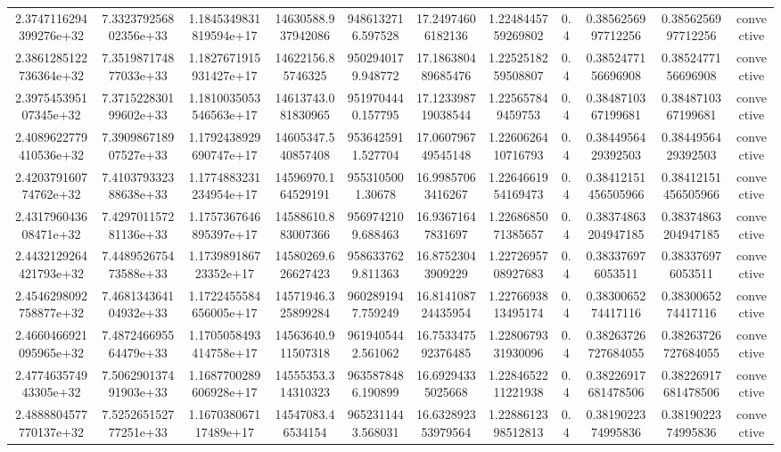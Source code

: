\begin{table}
\begin{tabular}{ccccccccccc}
2.3747116294399276e+32 & 7.332379256802356e+33 & 1.1845349831819594e+17 & 14630588.937942086 & 9486132716.597528 & 17.24974606182136 & 1.2248445759269802 & 0.4 & 0.3856256997712256 & 0.3856256997712256 & convective \\
2.3861285122736364e+32 & 7.351987174877033e+33 & 1.1827671915931427e+17 & 14622156.85746325 & 9502940179.948772 & 17.186380489685476 & 1.2252518259508807 & 0.4 & 0.3852477156696908 & 0.3852477156696908 & convective \\
2.397545395107345e+32 & 7.371522830199602e+33 & 1.1810035053546563e+17 & 14613743.081830965 & 9519704440.157795 & 17.123398719038544 & 1.225657849459753 & 0.4 & 0.3848710367199681 & 0.3848710367199681 & convective \\
2.4089622779410536e+32 & 7.390986718907527e+33 & 1.1792438929690747e+17 & 14605347.540857408 & 9536425911.527704 & 17.060796749545148 & 1.2260626410716793 & 0.4 & 0.3844956429392503 & 0.3844956429392503 & convective \\
2.420379160774762e+32 & 7.410379332388638e+33 & 1.1774883231234954e+17 & 14596970.164529191 & 9553105001.30678 & 16.99857063416267 & 1.2264661954169473 & 0.4 & 0.38412151456505966 & 0.38412151456505966 & convective \\
2.431796043608471e+32 & 7.429701157281136e+33 & 1.1757367646895397e+17 & 14588610.883007366 & 9569742109.688463 & 16.93671647831697 & 1.2268685071385657 & 0.4 & 0.38374863204947185 & 0.38374863204947185 & convective \\
2.4432129264421793e+32 & 7.448952675473588e+33 & 1.173989186723352e+17 & 14580269.626627423 & 9586337629.811363 & 16.87523043909229 & 1.2272695708927683 & 0.4 & 0.383376976053511 & 0.383376976053511 & convective \\
2.4546298092758877e+32 & 7.468134364104932e+33 & 1.1722455584656005e+17 & 14571946.325899284 & 9602891947.759249 & 16.814108724435954 & 1.2276693813495174 & 0.4 & 0.3830065274417116 & 0.3830065274417116 & convective \\
2.4660466921095965e+32 & 7.487246695564479e+33 & 1.1705058493414758e+17 & 14563640.911507318 & 9619405442.561062 & 16.753347592376485 & 1.2280679331930096 & 0.4 & 0.38263726727684055 & 0.38263726727684055 & convective \\
2.477463574943305e+32 & 7.506290137491903e+33 & 1.1687700289606928e+17 & 14555353.314310323 & 9635878486.190899 & 16.69294335025668 & 1.2284652211221938 & 0.4 & 0.38226917681478506 & 0.38226917681478506 & convective \\
2.4888804577770137e+32 & 7.525265152777251e+33 & 1.167038067117489e+17 & 14547083.46534154 & 9652311443.568031 & 16.632892353979564 & 1.2288612398512813 & 0.4 & 0.3819022374995836 & 0.3819022374995836 & convective \\

\end{tabular}
\end{table}
